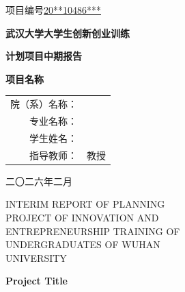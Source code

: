 \documentclass[UTF8,a4paper,zihao=-4]{ctexart}
\numberwithin{equation}{section}
\numberwithin{figure}{section}
\numberwithin{table}{section}
\begin{document}
\thispagestyle{empty}

\vspace*{1cm}
\begin{flushright}
\heiti{}
项目编号\quad\underline{20**10486***}
\end{flushright}

\vspace{2cm}

\begin{center}
    \songti{}
    \textbf{武汉大学大学生创新创业训练}
    
    \textbf{计划项目中期报告}

\vspace{2cm}

\heiti{}
\textbf{项目名称}

\vspace{2cm}

\songti{}
\begin{tabular}{rl}
院（系）名称： &  \\
专业名称： &  \\
学生姓名： &  \\
指导教师： &  \quad 教授 \\
\end{tabular}

\vfill

\songti{}
二〇二六年二月

\end{center}
\newpage

\thispagestyle{empty}
\begin{center}

\selectfont{}INTERIM REPORT OF PLANNING \\PROJECT OF INNOVATION AND\\
ENTREPRENEURSHIP TRAINING OF \\UNDERGRADUATES OF WUHAN \\UNIVERSITY
\end{center}

\vspace{1.5cm}
\begin{center}
    
    \textbf{Project Title}
\end{center}
\end{document}
